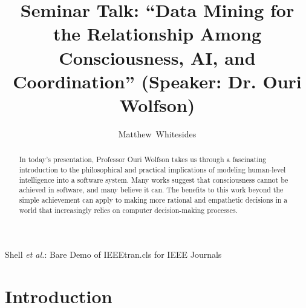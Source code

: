 \documentclass[journal,onecolumn]{IEEEtran}
\begin{document}
%
\title{Seminar Talk: ``Data Mining for the Relationship Among Consciousness, AI, and Coordination'' (Speaker: Dr. Ouri Wolfson)}

%
%
%
\author{Matthew~Whitesides}%

%
{Shell \MakeLowercase{\textit{et al.}}: Bare Demo of IEEEtran.cls for IEEE Journals}

\maketitle

\begin{abstract}
  In today's presentation, Professor Ouri Wolfson takes us through a fascinating introduction to the philosophical and practical implications of modeling human-level intelligence into a software system. Many works suggest that consciousness cannot be achieved in software, and many believe it can. The benefits to this work beyond the simple achievement can apply to making more rational and empathetic decisions in a world that increasingly relies on computer decision-making processes. 
\end{abstract}


\IEEEpeerreviewmaketitle

\section{Introduction}
\end{document}
